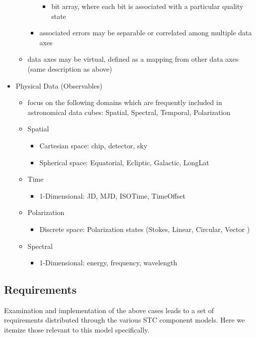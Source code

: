 \documentclass[11pt,a4paper]{ivoa}
\begin{document}
\begin{itemize}
\begin{itemize}
\begin{itemize}
\begin{itemize}
             \item bit array, where each bit is associated with a particular quality state 
          \end{itemize}
          \item associated errors may be separable or correlated among multiple data axes
        \end{itemize}
        \item data axes may be virtual, defined as a mapping from other data axes (same description as above)
    \end{itemize}
    \item Physical Data (Observables)
    \begin{itemize}
       \item focus on the following domains which are frequently included in astronomical data cubes: Spatial, Spectral, Temporal, Polarization
       \item Spatial
       \begin{itemize}
          \item Cartesian space:  chip, detector, sky
          \item Spherical space: Equatorial, Ecliptic, Galactic, LongLat
       \end{itemize}
       \item Time
       \begin{itemize}
          \item 1-Dimensional: JD, MJD, ISOTime, TimeOffset
       \end{itemize}
       \item Polarization
       \begin{itemize}
          \item Discrete space: Polarization states (Stokes, Linear, Circular, Vector )
       \end{itemize}
       \item Spectral
       \begin{itemize}
          \item 1-Dimensional: energy, frequency, wavelength
       \end{itemize}
    \end{itemize}
  \end{itemize}

\subsection{Requirements}
\label{sect:reqs}

 Examination and implementation of the above cases leads to a set of requirements distributed through the various STC component models.  Here we 
itemize those relevant to this model specifically.
\end{document}

